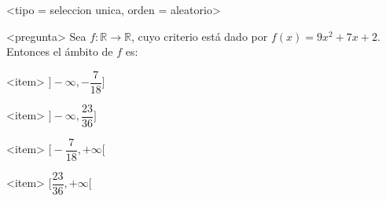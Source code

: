 <tipo = seleccion unica, orden = aleatorio>

<pregunta>
Sea $f:\mathbb R \to \mathbb R$, cuyo criterio est\'a dado por $f(x) = 9x^2 +7x +2$. Entonces el \'ambito de $f$ es:


<item>
$\bigg]{-}\infty, -\dfrac{7}{18}\bigg]$

<item>
$\bigg]{-}\infty, \dfrac{23}{36}\bigg]$

<item>
$\bigg[-\dfrac{7}{18}, +\infty\bigg[$

<item>
$\bigg[\dfrac{23}{36}, +\infty\bigg[$



